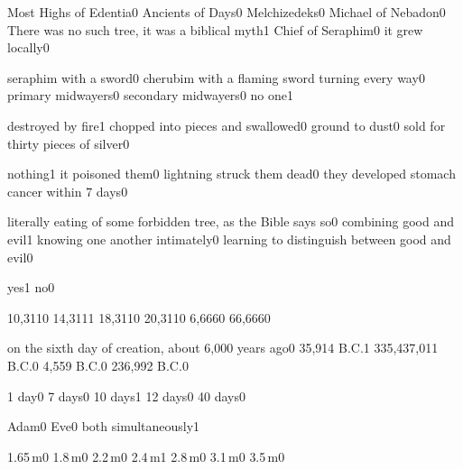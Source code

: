 {Most Highs of Edentia}{0}
{Ancients of Days}{0}
{Melchizedeks}{0}
{Michael of Nebadon}{0}
{There was no such tree, it was a biblical myth}{1}
{Chief of Seraphim}{0}
{it grew locally}{0}
\qstop


{seraphim with a sword}{0}
{cherubim with a flaming sword turning every way}{0}
{primary midwayers}{0}
{secondary midwayers}{0}
{no one}{1}
\qstop

{destroyed by fire}{1}
{chopped into pieces and swallowed}{0}
{ground to dust}{0}
{sold for thirty pieces of silver}{0}
\qstop

{nothing}{1}
{it poisoned them}{0}
{lightning struck them dead}{0}
{they developed stomach cancer within 7 days}{0}
\qstop

{literally eating of some forbidden tree, as the Bible says so}{0}
{combining good and evil}{1}
{knowing one another intimately}{0}
{learning to distinguish between good and evil}{0}
\qstop


{yes}{1}
{no}{0}
\qstop

{10,311}{0}
{14,311}{1}
{18,311}{0}
{20,311}{0}
{6,666}{0}
{66,666}{0}
\qstop

{on the sixth day of creation, about 6,000 years ago}{0}
{35,914 B.C.}{1}
{335,437,011 B.C.}{0}
{4,559 B.C.}{0}
{236,992 B.C.}{0}
\qstop

{1 day}{0}
{7 days}{0}
{10 days}{1}
{12 days}{0}
{40 days}{0}
\qstop

{Adam}{0}
{Eve}{0}
{both simultaneously}{1}
\qstop

{1.65\,m}{0}
{1.8\,m}{0}
{2.2\,m}{0}
{2.4\,m}{1}
{2.8\,m}{0}
{3.1\,m}{0}
{3.5\,m}{0}
\qstop


